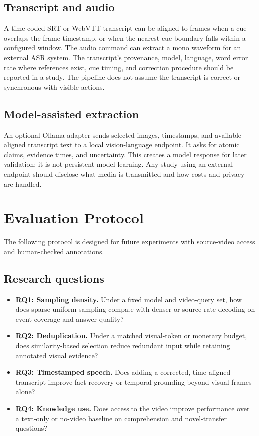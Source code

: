 \documentclass[11pt]{article}
\begin{document}
\subsection{Transcript and audio}
A time-coded SRT or WebVTT transcript can be aligned to frames when a cue overlaps the frame timestamp, or when the nearest cue boundary falls within a configured window. The audio command can extract a mono waveform for an external ASR system. The transcript's provenance, model, language, word error rate where references exist, cue timing, and correction procedure should be reported in a study. The pipeline does not assume the transcript is correct or synchronous with visible actions.

\subsection{Model-assisted extraction}
An optional Ollama adapter sends selected images, timestamps, and available aligned transcript text to a local vision-language endpoint. It asks for atomic claims, evidence times, and uncertainty. This creates a model response for later validation; it is not persistent model learning. Any study using an external endpoint should disclose what media is transmitted and how costs and privacy are handled.

\section{Evaluation Protocol}
The following protocol is designed for future experiments with source-video access and human-checked annotations.

\subsection{Research questions}
\begin{itemize}[leftmargin=1.5em]
  \item \textbf{RQ1: Sampling density.} Under a fixed model and video-query set, how does sparse uniform sampling compare with denser or source-rate decoding on event coverage and answer quality?
  \item \textbf{RQ2: Deduplication.} Under a matched visual-token or monetary budget, does similarity-based selection reduce redundant input while retaining annotated visual evidence?
  \item \textbf{RQ3: Timestamped speech.} Does adding a corrected, time-aligned transcript improve fact recovery or temporal grounding beyond visual frames alone?
  \item \textbf{RQ4: Knowledge use.} Does access to the video improve performance over a text-only or no-video baseline on comprehension and novel-transfer questions?
\end{itemize}
\end{document}
